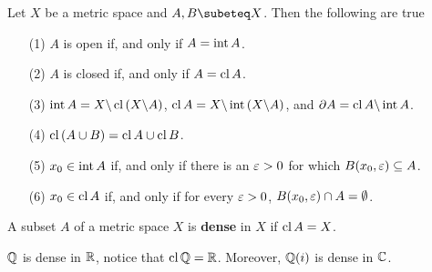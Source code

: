 \begin{lemma}\label{2.1.3}
    Let $X$ be a metric space and  $A,B \subeteq X$. Then the following are true
    \begin{enumerate}
        \item[(1)] $A$ is open if, and only if  $A=\operatorname{int}{A}$.

        \item[(2)] $A$ is closed if, and only if  $A=\operatorname{cl}{A}$.

        \item[(3)] $\operatorname{int}{A}=X \backslash \operatorname{cl}{(X \backslash A)}$,
            $\operatorname{cl}{A}=X \backslash \operatorname{int}{(X \backslash A)}$, and
            $\partial{A}=\operatorname{cl}{A} \backslash \operatorname{int}{A}$.

        \item[(4)] $\operatorname{cl}{(A \cup B)}=\operatorname{cl}{A} \cup \operatorname{cl}{B}$.

        \item[(5)] $x_0 \in \operatorname{int}{A}$ if, and only if there is an $\varepsilon>0$ for
            which  $B(x_0,\varepsilon) \subseteq A$.

        \item[(6)] $x_0 \in \operatorname{cl}{A}$ if, and only if for every $\varepsilon>0$, $B(x_0,\varepsilon)
            \cap A=\emptyset$.
    \end{enumerate}
\end{lemma}

\begin{definition}
    A subset $A$ of a metric space $X$ is \textbf{dense} in $X$ if  $\operatorname{cl}{A}=X$.
\end{definition}

\begin{example}\label{example_2.4}
    $\mathbb{Q}$ is dense in  $\mathbb{R}$, notice that  $\operatorname{cl}{\mathbb{Q}}=\mathbb{R}$. Moreover, $\mathbb{Q}(i)$ is
    dense in $\mathbb{C}$.
\end{example}

